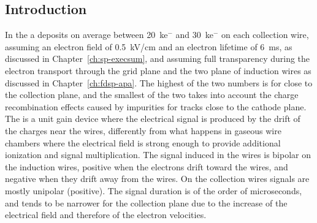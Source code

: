 \subsection{Introduction}
\label{sec:fdsp-tpcelec-overview-intro}


In the   a  deposits on average between
\SI{20}{k}{e$^-$} and \SI{30}{k}{e$^-$} on each collection wire, assuming an electron field
of \SI{0.5}{kV/cm} and an electron lifetime of \SI{6}{ms}, as discussed in
Chapter~\ref{ch:sp-execsum}, and assuming full transparency during the 
electron transport through the grid plane and the two plane of induction
wires as discussed in Chapter~\ref{ch:fdsp-apa}. The highest of the two numbers 
is for  close to the collection plane, and the smallest of the two
takes into account the charge recombination effects caused by impurities for 
tracks close to the cathode plane. The    is 
a unit gain device where the electrical signal is produced by the drift of the
charges near the wires, differently from what happens in gaseous wire 
chambers where the electrical field is strong enough to provide additional
ionization and signal multiplication. The signal induced in the 
 wires is bipolar on the induction wires, positive when the
electrons drift toward the wires, and negative when they drift away from
the wires. On the collection wires signals are mostly unipolar (positive).
The signal duration is of the order of microseconds, and tends to be narrower
for the collection plane due to the increase of the electrical field and
therefore of the electron velocities.

